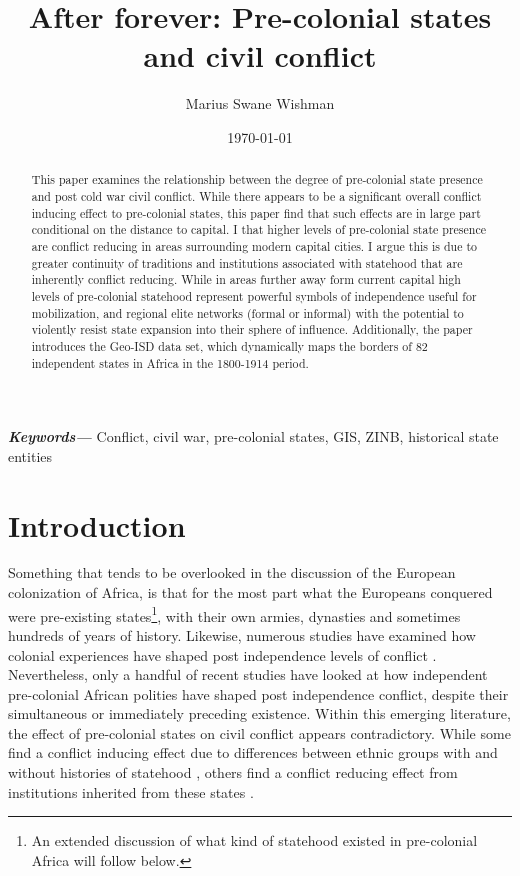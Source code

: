 \documentclass[12pt]{article}
\title{After forever: Pre-colonial states and civil conflict}
\author[1]{Marius Swane Wishman}
\affil[1]{Department of Sociology and Political Science, NTNU}
\date{\today}
\providecommand{\keywords}[1]
{
	\small	
	\textbf{\textit{Keywords---}} #1
}
\begin{document}
\maketitle

\begin{abstract}

This paper examines the relationship between the degree of pre-colonial state
presence and post cold war civil conflict. While there appears to be a
significant overall conflict inducing effect to pre-colonial states, this paper
find that such effects are in large part conditional on the distance to capital.
I that higher levels of pre-colonial state presence are conflict reducing in
areas surrounding modern capital cities. I argue this is due to greater
continuity of traditions and institutions associated with statehood that are
inherently conflict reducing. While in areas further away form current capital
high levels of pre-colonial statehood represent powerful symbols of independence
useful for mobilization, and regional elite networks (formal or informal) with
the potential to violently resist state expansion into their sphere of
influence. Additionally, the paper introduces the Geo-ISD data set, which
dynamically maps the borders of 82 independent states in Africa in the 1800-1914
period. 

\end{abstract}

\keywords{Conflict, civil war, pre-colonial states, GIS, ZINB, historical state
entities}


\onehalfspacing


\newpage

\section{Introduction} \label{Introduction}

Something that tends to be overlooked in the discussion of the European
colonization of Africa, is that for the most part what the Europeans conquered
were pre-existing states\footnote{An extended discussion of what kind of
statehood existed in pre-colonial Africa will follow below.}, with their own
armies, dynasties and sometimes hundreds of years of history. Likewise, numerous
studies have examined how colonial experiences have shaped post independence
levels of conflict \citep{achankeng2013conflict, Blanton_2001, carton2000blood,
Cohen_2014, Nunn2008, Wucherpfennig2016}. Nevertheless, only a handful of recent
studies have looked at how independent pre-colonial African polities have shaped
post independence conflict, despite their simultaneous or immediately preceding
existence. Within this emerging literature, the effect of pre-colonial states on
civil conflict appears contradictory. While some find a conflict inducing effect
due to differences between ethnic groups with and without histories of statehood
\citep{Englebert2002, Paine2019}, others find a conflict reducing effect from
institutions inherited from these states \citep{Depetris-Chauvin2016, Wig2016}.
\end{document}
